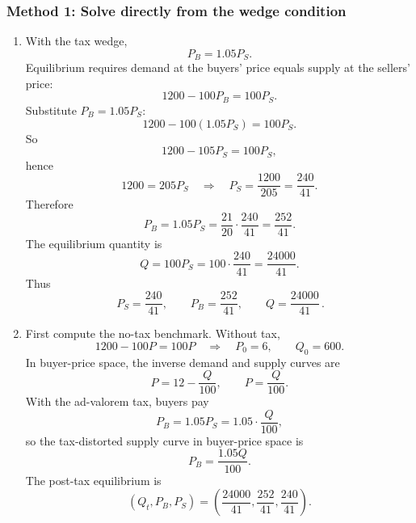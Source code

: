 \documentclass[12pt]{article}
\begin{document}
\subsubsection{Method 1: Solve directly from the wedge condition}
\begin{enumerate}[label=(\alph*)]
    \item With the tax wedge,
    \[
    P_B=1.05P_S.
    \]
    Equilibrium requires demand at the buyers' price equals supply at the sellers' price:
    \[
    1200-100P_B=100P_S.
    \]
    Substitute \(P_B=1.05P_S\):
    \[
    1200-100(1.05P_S)=100P_S.
    \]
    So
    \[
    1200-105P_S=100P_S,
    \]
    hence
    \[
    1200=205P_S
    \quad\Longrightarrow\quad
    P_S=\frac{1200}{205}=\frac{240}{41}.
    \]
    Therefore
    \[
    P_B=1.05P_S=\frac{21}{20}\cdot \frac{240}{41}=\frac{252}{41}.
    \]
    The equilibrium quantity is
    \[
    Q=100P_S=100\cdot \frac{240}{41}=\frac{24000}{41}.
    \]
    Thus
    \[
    \boxed{\,P_S=\frac{240}{41},\qquad P_B=\frac{252}{41},\qquad Q=\frac{24000}{41}\,.}
    \]

    \item First compute the no-tax benchmark. Without tax,
    \[
    1200-100P=100P
    \quad\Longrightarrow\quad
    P_0=6,
    \qquad
    Q_0=600.
    \]
    In buyer-price space, the inverse demand and supply curves are
    \[
    P=12-\frac{Q}{100},
    \qquad
    P=\frac{Q}{100}.
    \]
    With the ad-valorem tax, buyers pay
    \[
    P_B=1.05P_S=1.05\cdot \frac{Q}{100},
    \]
    so the tax-distorted supply curve in buyer-price space is
    \[
    P_B=\frac{1.05Q}{100}.
    \]
    The post-tax equilibrium is
    \[
    \left(Q_t,P_B,P_S\right)=\left(\frac{24000}{41},\frac{252}{41},\frac{240}{41}\right).
    \]


\begin{center}
\end{center}
\end{enumerate}
\end{document}
